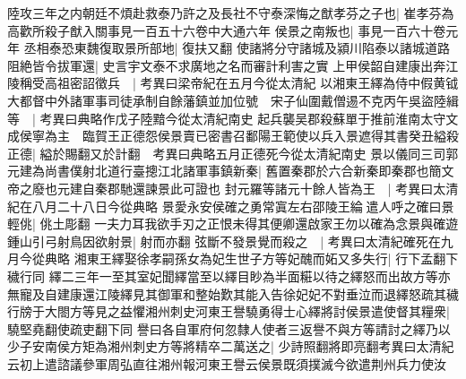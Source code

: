 陸攻三年之内朝廷不煩赴救泰乃許之及長社不守泰深悔之猷孝芬之子也|{
	崔孝芬為高歡所殺子猷入關事見一百五十六卷中大通六年}
侯景之南叛也|{
	事見一百六十卷元年}
丞相泰恐東魏復取景所部地|{
	復扶又翻}
使諸將分守諸城及潁川陷泰以諸城道路阻絶皆令拔軍還|{
	史言宇文泰不求廣地之名而審計利害之實}
上甲侯韶自建康出奔江陵稱受高祖密詔徵兵　|{
	考異曰梁帝紀在五月今從太清紀}
以湘東王繹為侍中假黄钺大都督中外諸軍事司徒承制自餘藩鎮並加位號　宋子仙圍戴僧逷不克丙午吳盜陸緝等　|{
	考異曰典略作戊子陸黯今從太清紀南史}
起兵襲吴郡殺蘇單于推前淮南太守文成侯寧為主　臨賀王正德怨侯景賣已密書召鄱陽王範使以兵入景遮得其書癸丑縊殺正德|{
	縊於賜翻又於計翻　考異曰典略五月正德死今從太清紀南史}
景以儀同三司郭元建為尚書僕射北道行臺摠江北諸軍事鎮新秦|{
	舊置秦郡於六合新秦即秦郡也簡文帝之廢也元建自秦郡馳還諫景此可證也}
封元羅等諸元十餘人皆為王　|{
	考異曰太清紀在八月二十八日今從典略}
景愛永安侯確之勇常寘左右邵陵王綸遣人呼之確曰景輕佻|{
	佻土彫翻}
一夫力耳我欲手刃之正恨未得其便卿還啟家王勿以確為念景與確遊鍾山引弓射鳥因欲射景|{
	射而亦翻}
弦斷不發景覺而殺之　|{
	考異曰太清紀確死在九月今從典略}
湘東王繹娶徐孝嗣孫女為妃生世子方等妃醜而妬又多失行|{
	行下孟翻下穢行同}
繹二三年一至其室妃聞繹當至以繹目眇為半面糚以待之繹怒而出故方等亦無寵及自建康還江陵繹見其御軍和整始歎其能入告徐妃妃不對垂泣而退繹怒疏其穢行牓于大閤方等見之益懼湘州刺史河東王譽驍勇得士心繹將討侯景遣使督其糧衆|{
	驍堅堯翻使疏吏翻下同}
譽曰各自軍府何忽隸人使者三返譽不與方等請討之繹乃以少子安南侯方矩為湘州刺史方等將精卒二萬送之|{
	少詩照翻將即亮翻考異曰太清紀云初上遣諮議參軍周弘直往湘州報河東王譽云侯景既須撲滅今欲遣荆州兵力使汝}


